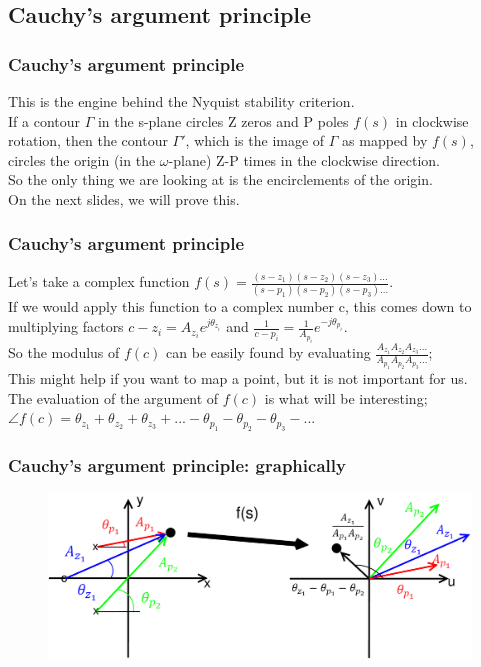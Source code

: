 \subsection{Cauchy's argument principle}

\begin{frame}
	\frametitle{Cauchy's argument principle}
	\vspace{-7ex}
	This is the engine behind the Nyquist stability criterion.\\
	\medskip
	If a contour $\Gamma$ in the s-plane circles Z zeros and P poles $f(s)$ in clockwise rotation, then the contour $\Gamma'$, which is the image of $\Gamma$ as mapped by $f(s)$, circles the origin (in the $\omega$-plane) Z-P times in the clockwise direction.\\
	\medskip
	So the only thing we are looking at is the encirclements of the origin. \\
	On the next slides, we will prove this.
\end{frame}

\begin{frame}
	\frametitle{Cauchy's argument principle}
	\vspace{-3ex}
	Let's take a complex function $f(s)=\frac{(s-z_1)(s-z_2)(s-z_3)...}{(s-p_1)(s-p_2)(s-p_3)...}$.\\
	\medskip
	If we would apply this function to a complex number c, this comes down to multiplying factors $c-z_i = A_{z_{i}}e^{j\theta_{z_{i}}}$ and $\frac{1}{c-p_i}=\frac{1}{A_{p_{i}}}e^{-j\theta_{p_{i}}}$.\\
	\medskip
	So the modulus of $f(c)$ can be easily found by evaluating $\frac{A_{z_{1}}A_{z_{2}}A_{z_{3}}...}{A_{p_{1}}A_{p_{2}}A_{p_{3}}...}$;\\
	\medskip
	This might help if you want to map a point, but it is not important for us.\\
	\medskip
	The evaluation of the argument of $f(c)$ is what will be interesting; $\angle f(c) = \theta_{z_{1}}+\theta_{z_{2}}+\theta_{z_{3}}+...-\theta_{p_{1}}-\theta_{p_{2}}-\theta_{p_{3}}-...$
\end{frame}

\begin{frame}
	\frametitle{Cauchy's argument principle: graphically}
	\begin{figure}
		\includegraphics[width=1.0\linewidth]{graphical}
	\end{figure}
\end{frame}

